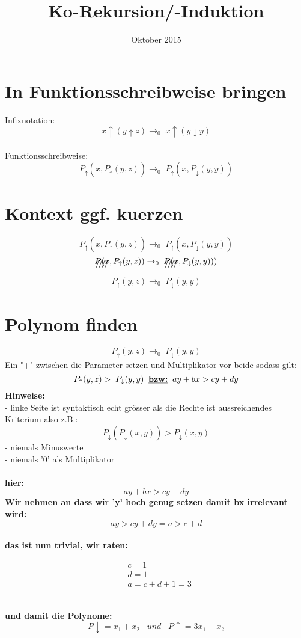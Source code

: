 \documentclass{article}
\title{Ko-Rekursion/-Induktion}
\date{Oktober 2015}
\begin{document}
	\maketitle
	\section{In Funktionsschreibweise bringen}
	Infixnotation:
	\[x \uparrow ( y \uparrow z) \rightarrow_{0}\; x \uparrow (y \downarrow y)\]\\
	Funktionsschreibweise:
	\[ P_{\uparrow}(x,P_{\uparrow}(y,z)) \rightarrow_{0} \; P_{\uparrow}(x,P_{\downarrow}(y,y))\]
	\section{Kontext ggf. kuerzen}
	\[ P_{\uparrow}(x,P_{\uparrow}(y,z)) \rightarrow_{0} \; P_{\uparrow}(x,P_{\downarrow}(y,y))\]
	\[\xout{P(x},P_{\uparrow}(y,z)) \rightarrow_{0} \; \xout{P(x},P_{\downarrow}(y,y)))\]
	\[P_{\uparrow}(y,z) \rightarrow_{0} \;P_{\downarrow}(y,y)\]
	\section{Polynom finden}
	\[P_{\uparrow}(y,z) \rightarrow_{0} \;P_{\downarrow}(y,y)\]
	Ein "+" zwischen die Parameter setzen und Multiplikator vor beide sodass gilt:
	\[P_{\uparrow}(y,z) > \;P_{\downarrow}(y,y)\;\;\textbf{\underline{bzw:}}\;\;ay+bx>cy+dy\]
	\textbf{Hinweise:}\\
	- linke Seite ist syntaktisch echt gr\"osser als die Rechte ist aussreichendes Kriterium also z.B.:
	\[ P_{\downarrow}( P_{\downarrow}(x,y) ) > P_{\downarrow}(x,y) \]
	- niemals Minuswerte \\
	- niemals '0' als Multiplikator\\\\
	\textbf{hier:}
		\[ay+bx>cy+dy\]
	\textbf{Wir nehmen an dass wir 'y' hoch genug setzen damit bx irrelevant wird:}\\
		\[ay>cy+dy = a>c+d \]
	\\ \textbf{das ist nun trivial, wir raten:}
	\begin{fleqn}
		\begin{align*}
			&c = 1 \\
			&d = 1 \\
			&a = c+d+1 = 3
		\end{align*}
	\end{fleqn} \\
	\textbf{und damit die Polynome:}\\
	\[P\downarrow = x_1+x_2 \;\;\; und \;\;\; P\uparrow = 3x_1+x_2 \] \\
\end{document}
